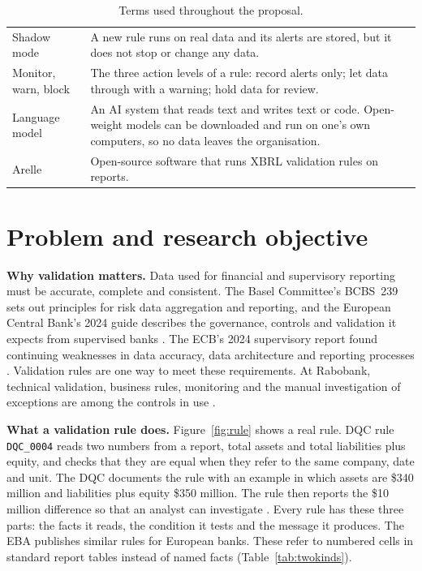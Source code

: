 \documentclass[11pt,a4paper]{article}
\let\oldsection\section
\renewcommand{\section}{\FloatBarrier\oldsection}
\begin{document}
\begin{table}[htbp]
\begin{tabularx}{\textwidth}{P{3.0cm} L}
Shadow mode & A new rule runs on real data and its alerts are stored, but it does not stop or change any data. \\
Monitor, warn, block & The three action levels of a rule: record alerts only; let data through with a warning; hold data for review. \\
Language model & An AI system that reads text and writes text or code. Open-weight models can be downloaded and run on one's own computers, so no data leaves the organisation. \\
Arelle & Open-source software that runs XBRL validation rules on reports. \\
\bottomrule
\end{tabularx}
\caption{Terms used throughout the proposal.}
\label{tab:terms}
\end{table}

\oldsection{Problem and research objective}
\label{sec:problem}

\textbf{Why validation matters.} Data used for financial and supervisory reporting must be accurate, complete and consistent. The Basel Committee's BCBS~239 sets out principles for risk data aggregation and reporting, and the European Central Bank's 2024 guide describes the governance, controls and validation it expects from supervised banks \cite{bcbs239,ecbrdarr}. The ECB's 2024 supervisory report found continuing weaknesses in data accuracy, data architecture and reporting processes \cite{ecbar}. Validation rules are one way to meet these requirements. At Rabobank, technical validation, business rules, monitoring and the manual investigation of exceptions are among the controls in use \cite{tran}.

\textbf{What a validation rule does.} Figure~\ref{fig:rule} shows a real rule. DQC rule \texttt{DQC\_0004} reads two numbers from a report, total assets and total liabilities plus equity, and checks that they are equal when they refer to the same company, date and unit. The DQC documents the rule with an example in which assets are \$340 million and liabilities plus equity \$350 million. The rule then reports the \$10 million difference so that an analyst can investigate \cite{dqc0004}. Every rule has these three parts: the facts it reads, the condition it tests and the message it produces. The EBA publishes similar rules for European banks. These refer to numbered cells in standard report tables instead of named facts (Table~\ref{tab:twokinds}).
\end{document}

